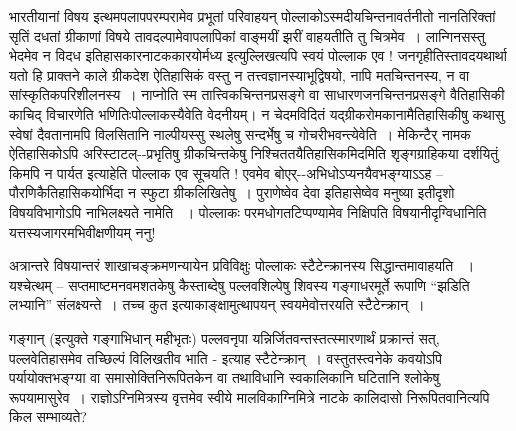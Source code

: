 भारतीयानां विषय इत्थमपलापपरम्परामेव प्रभूतां परिवाहयन् पोल्लाकोऽस्मदीयचिन्तनावर्तनीतो नानतिरिक्तां सृतिं दधतां ग्रीकाणां विषये तावदल्पामेवापलापिकां वाङ्मयीं झरीं वाहयतीति तु चित्रमेव~। लान्गिनसस्तु  भेदमेव न विदध इतिहासकारनाटककारयोर्मध्य इत्युल्लिखत्यपि स्वयं पोल्लाक एव ! जनगृहीतिस्तावदयथार्था यतो हि प्राक्तने काले ग्रीकदेश ऐतिहासिकं वस्तु न तत्त्वज्ञानस्याभूद्विषयो, नापि मतचिन्तनस्य, न वा सांस्कृतिकपरिशीलनस्य~। नाप्नोति स्म तात्त्विकचिन्तनप्रसङ्गे वा साधारणजनचिन्तनप्रसङ्गे वैतिहासिकी काचिद् विचारणेति भणितिःपोल्लाकस्यैवेति वेदनीयम्। न चेदमविदितं यद्ग्रीकरोमकानामैतिहासिकीषु कथासु स्वेषां दैवतानामपि विलसितानि नाल्पीयस्सु स्थलेषु सन्दर्भेषु च गोचरीभवन्त्येवेति~। मेकिन्टैर् नामक ऐतिहासिकोऽपि अरिस्टाटल्--प्रभृतिषु ग्रीकचिन्तकेषु निश्चिततयैतिहासिकमिदमिति शृङ्गग्राहिकया दर्शयितुं किमपि न पार्यत इत्याहेति पोल्लाक एव सूचयति ! एवमेव बोएर्--अभिधोऽप्यनयैव\break भङ्ग्याऽऽह – पौरणिकैतिहासिकयोर्भिदा न स्फुटा ग्रीकलिखितेषु~। पुराणेष्वेव देवा इतिहासेष्वेव मनुष्या इतीदृशो विषयविभागोऽपि नाभिलक्ष्यते नामेति ~। पोल्लाकः परमधोगतटिप्पण्यामेव निक्षिपति विषयानीदृग्विधानिति यत्तस्यजागरमभिवीक्षणीयम् ननु!

अत्रान्तरे विषयान्तरं शाखाचङ्क्रमणन्यायेन प्रविविक्षुः पोल्लाकः स्टैटेन्क्रानस्य  सिद्धान्तमावाहयति ~। यश्चेत्थम् – सप्तमाष्टमनवमशतकेषु कैस्ताब्देषु पल्लवशिल्पेषु शिवस्य गङ्गाधरमूर्ते रूपाणि “झडिति लभ्यानि” संलक्ष्यन्ते~। तच्च कुत इत्याकाङ्क्षामुत्थापयन् स्वयमेवोत्तरयति स्टैटेन्क्रान्~।

गङ्गान् (इत्युक्ते गङ्गाभिधान् महीभृतः) पल्लवनृपा यन्निर्जितवन्तस्तत्स्मारणार्थं प्रक्रान्तं सत्, पल्लवेतिहासमेव तच्छिल्पं विलिखतीव भाति - इत्याह स्टैटेन्क्रान्~। वस्तुतस्त्वनेके कवयोऽपि पर्यायोक्तभङ्ग्या वा समासोक्तिनिरूपितकेन वा तथाविधानि स्वकालिकानि घटितानि श्लोकेषु रूपयामासुरेव~। राज्ञोऽग्निमित्रस्य वृत्तमेव स्वीये मालविकाग्निमित्रे नाटके कालिदासो निरूपितवानित्यपि किल सम्भाव्यते?


